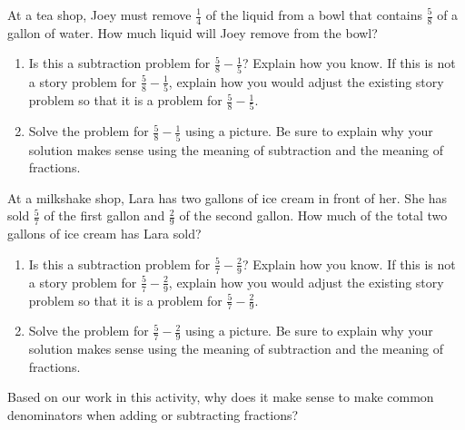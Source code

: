 \documentclass[nooutcomes,noauthor]{ximera}
\begin{document}
\begin{problem}
At a tea shop, Joey must remove $\frac{1}{4}$ of the liquid from a bowl that contains $\frac{5}{8}$ of a gallon of water. How much liquid will Joey remove from the bowl?

\begin{enumerate}
	\item Is this a subtraction problem for $\frac{5}{8} - \frac{1}{5}$? Explain how you know.  If this is not a story problem for  $\frac{5}{8} - \frac{1}{5}$, explain how you would adjust the existing story problem so that it is a problem for  $\frac{5}{8} - \frac{1}{5}$.
	\item Solve the problem for  $\frac{5}{8} - \frac{1}{5}$ using a picture. Be sure to explain why your solution makes sense using the meaning of subtraction and the meaning of fractions.
\end{enumerate}
\end{problem}




\begin{problem}
At a milkshake shop, Lara has two gallons of ice cream in front of her. She has sold $\frac{5}{7}$ of the first gallon and $\frac{2}{9}$ of the second gallon. How much of the total two gallons of ice cream has Lara sold?

\begin{enumerate}
	\item Is this a subtraction problem for $\frac{5}{7} - \frac{2}{9}$? Explain how you know.  If this is not a story problem for  $\frac{5}{7} - \frac{2}{9}$, explain how you would adjust the existing story problem so that it is a problem for  $\frac{5}{7} - \frac{2}{9}$.
	\item Solve the problem for  $\frac{5}{7} - \frac{2}{9}$ using a picture. Be sure to explain why your solution makes sense using the meaning of subtraction and the meaning of fractions.
\end{enumerate}
\end{problem}


\begin{problem}
Based on our work in this activity, why does it make sense to make common denominators when adding or subtracting fractions?
\end{problem}



\newpage
\end{document}

